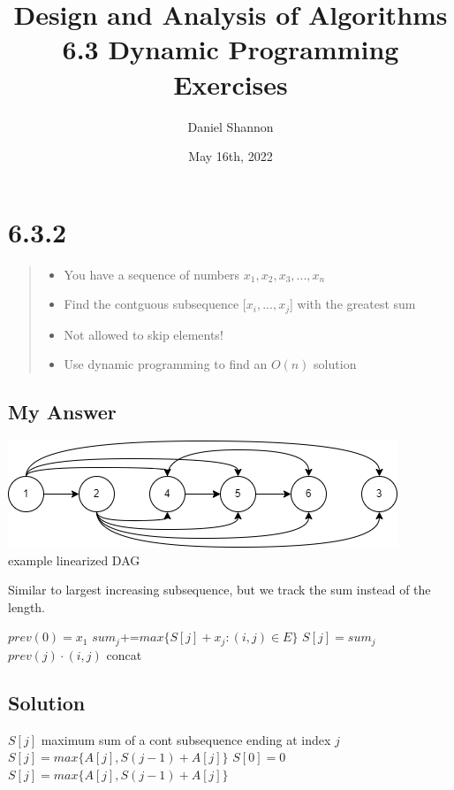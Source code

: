 \documentclass[12pt, letterpaper, twoside]{article}
\title{%
Design and Analysis of Algorithms\\
\large 6.3 Dynamic Programming Exercises
}
\author{Daniel Shannon}
\date{May 16th, 2022}
\begin{document}
\begin{titlepage}
\maketitle
\end{titlepage}
\section*{6.3.2}
\begin{quote}
  \begin{itemize}
    \item You have a sequence of numbers $x_1, x_2,x_3,...,x_n$
    \item Find the contguous subsequence [$x_i,...,x_j$] with the greatest sum
    \item Not allowed to skip elements!
    \item Use dynamic programming to find an $O(n)$ solution
  \end{itemize}
  
\end{quote}
\subsection*{My Answer}
\begin{center}
    \includegraphics[scale=.6]{6_3_2.png}
    \\ example linearized DAG
\end{center}
Similar to largest increasing subsequence, but we track the sum instead of the length.
\begin{algorithmic}
  \State $prev(0)=x_1$
  \State $sum_j$+=$max\{S[j]+x_j:(i,j)\in{E}\}$
  \State $S[j]=sum_j$
  \State $prev(j)\cdot{(i,j)}$ concat
  \EndIf
  \EndFor
\end{algorithmic}
\subsection*{Solution}
\begin{algorithmic}
  \State $S[j]$ maximum sum of a cont subsequence ending at index $j$
  \State $S[j]=max\{A[j],S(j-1)+A[j]\}$
  \State $S[0]=0$
  \State $S[j]=max\{A[j],S(j-1)+A[j]\}$
  \EndFor
\end{algorithmic}
\newpage
\end{document}
